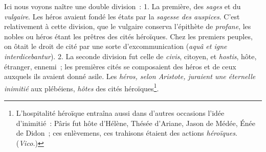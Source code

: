 \documentclass[french,twoside]{book} %
\begin{document}
Ici nous voyons naître une double division : 1. La première, des {\itshape sages} et du {\itshape vulgaire}. Les héros avaient fondé les états par la {\itshape sagesse des auspices}. C’est relativement à cette division, que le vulgaire conserva l’épithète de {\itshape profane}, les nobles ou héros étant les prêtres des cités héroïques. Chez les premiers peuples, on ôtait le droit de cité par une sorte d’excommunication ({\itshape aquâ et igne interdicebantur}). 2. La seconde division fut celle de {\itshape civis}, citoyen, et {\itshape hostis}, hôte, étranger, ennemi ; les premières cités se composaient des héros et de ceux auxquels ils avaient donné asile. Les \emph{{\itshape héros}, selon Aristote, {\itshape  juraient une éternelle inimitié}} aux plébéiens, {\itshape hôtes} des cités héroïques\footnote{L’hospitalité héroïque entraîna aussi dans d’autres occasions l’idée d’inimitié : Pâris fut hôte d’Hélène, Thésée d’Ariane, Jason de Médée, Énée de Didon ; ces enlèvemens, ces trahisons étaient des actions {\itshape héroïques}. ({\itshape Vico.})}.
\end{document}

